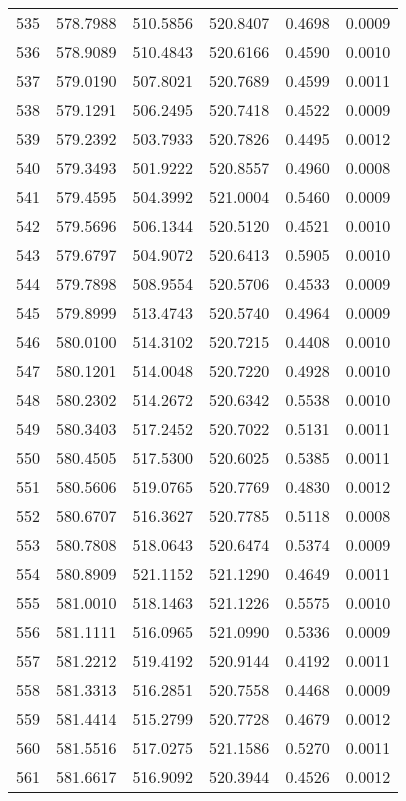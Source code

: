 \documentclass{article}
\begin{document}
\begin{longtable}{|c|c|c|c|c|c|}
535 & 578.7988 & 510.5856 & 520.8407 & 0.4698 & 0.0009 \\
536 & 578.9089 & 510.4843 & 520.6166 & 0.4590 & 0.0010 \\
537 & 579.0190 & 507.8021 & 520.7689 & 0.4599 & 0.0011 \\
538 & 579.1291 & 506.2495 & 520.7418 & 0.4522 & 0.0009 \\
539 & 579.2392 & 503.7933 & 520.7826 & 0.4495 & 0.0012 \\
540 & 579.3493 & 501.9222 & 520.8557 & 0.4960 & 0.0008 \\
541 & 579.4595 & 504.3992 & 521.0004 & 0.5460 & 0.0009 \\
542 & 579.5696 & 506.1344 & 520.5120 & 0.4521 & 0.0010 \\
543 & 579.6797 & 504.9072 & 520.6413 & 0.5905 & 0.0010 \\
544 & 579.7898 & 508.9554 & 520.5706 & 0.4533 & 0.0009 \\
545 & 579.8999 & 513.4743 & 520.5740 & 0.4964 & 0.0009 \\
546 & 580.0100 & 514.3102 & 520.7215 & 0.4408 & 0.0010 \\
547 & 580.1201 & 514.0048 & 520.7220 & 0.4928 & 0.0010 \\
548 & 580.2302 & 514.2672 & 520.6342 & 0.5538 & 0.0010 \\
549 & 580.3403 & 517.2452 & 520.7022 & 0.5131 & 0.0011 \\
550 & 580.4505 & 517.5300 & 520.6025 & 0.5385 & 0.0011 \\
551 & 580.5606 & 519.0765 & 520.7769 & 0.4830 & 0.0012 \\
552 & 580.6707 & 516.3627 & 520.7785 & 0.5118 & 0.0008 \\
553 & 580.7808 & 518.0643 & 520.6474 & 0.5374 & 0.0009 \\
554 & 580.8909 & 521.1152 & 521.1290 & 0.4649 & 0.0011 \\
555 & 581.0010 & 518.1463 & 521.1226 & 0.5575 & 0.0010 \\
556 & 581.1111 & 516.0965 & 521.0990 & 0.5336 & 0.0009 \\
557 & 581.2212 & 519.4192 & 520.9144 & 0.4192 & 0.0011 \\
558 & 581.3313 & 516.2851 & 520.7558 & 0.4468 & 0.0009 \\
559 & 581.4414 & 515.2799 & 520.7728 & 0.4679 & 0.0012 \\
560 & 581.5516 & 517.0275 & 521.1586 & 0.5270 & 0.0011 \\
561 & 581.6617 & 516.9092 & 520.3944 & 0.4526 & 0.0012 \\

\end{longtable}
\end{document}
